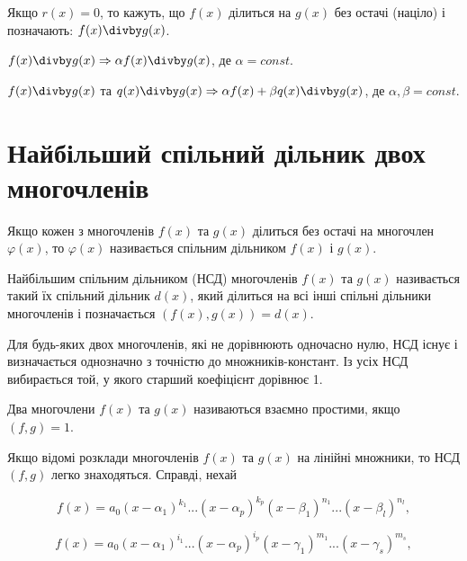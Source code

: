 \begin{definition}
	Якщо $r(x) = 0$, то кажуть, що $f(x)$ ділиться на $g(x)$ без остачі (націло)
	і позначають: $f(x) \divby g(x)$.
\end{definition}

\begin{claim}
	$f(x) \divby g(x) \Rightarrow \alpha f(x) \divby g(x)$, де $\alpha = const$.
\end{claim}

\begin{claim}
	$f(x) \divby g(x)$ та $q(x) \divby g(x) \Rightarrow \alpha f(x) + \beta q(x) \divby g(x)$,
	де $\alpha, \beta = const$. 
\end{claim}

\section{Найбільший спільний дільник двох многочленів}

\begin{definition}
	Якщо кожен з многочленів $f(x)$ та $g(x)$ ділиться без остачі на
	многочлен $\varphi(x)$, то $\varphi(x)$ називається спільним дільником $f(x)$ і $g(x)$.
\end{definition}

\begin{definition}
	Найбільшим спільним дільником (НСД) многочленів $f(x)$ та $g(x)$
	називається такий їх спільний дільник $d(x)$, який ділиться на всі інші спільні
	дільники многочленів і позначається $(f(x),g(x)) = d(x)$.
\end{definition}

Для будь-яких двох многочленів, які не дорівнюють одночасно нулю, НСД
існує і визначається однозначно з точністю до множників-констант. Із усіх НСД
вибирається той, у якого старший коефіцієнт дорівнює 1.

\begin{definition}
	Два многочлени $f(x)$ та $g(x)$ називаються взаємно простими, якщо $(f,g) = 1$.
\end{definition}

Якщо відомі розклади многочленів $f(x)$ та $g(x)$ на лінійні множники, то НСД
$(f,g)$ легко знаходяться. Справді, нехай

$$f(x) = a_0(x-\alpha_{1})^{k_1}...(x-\alpha_{p})^{k_p}(x-\beta_{1})^{n_1}...(x-\beta_{l})^{n_l},$$

$$f(x) = a_0(x-\alpha_{1})^{i_1}...(x-\alpha_{p})^{i_p}(x-\gamma_{1})^{m_1}...(x-\gamma_{s})^{m_s},$$

